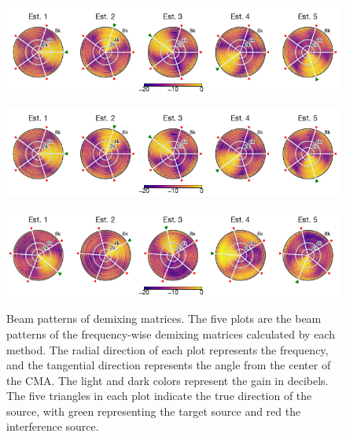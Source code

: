 \documentclass[sip,biber]{now-journal}
\begin{document}
\begin{figure}[t]
  \centering
  \begin{minipage}[t]{\linewidth}
    \centering\includegraphics{figures/plots/beam-pattern/ref.pdf}\label{fig:plot:bp:ref}
  \end{minipage}
  \begin{minipage}[t]{\linewidth}
    \centering\includegraphics{figures/plots/beam-pattern/rot_sfiiva-o.pdf}\label{fig:plot:bp:sfiivao}
  \end{minipage}
  \begin{minipage}[t]{\linewidth}
    \centering\includegraphics{figures/plots/beam-pattern/rot_sfiiva-m.pdf}\label{fig:plot:bp:sfiivam}
  \end{minipage}
  \caption{%
    Beam patterns of demixing matrices.
    The five plots are the beam patterns of the frequency-wise demixing matrices calculated by each method.
    The radial direction of each plot represents the frequency, and the tangential direction represents the angle from the center of the CMA.
    The light and dark colors represent the gain in decibels.
    The five triangles in each plot indicate the true direction of the source, with green representing the target source and red the interference source.
  }%
  \label{fig:plot:beam}
\end{figure}
\end{document}

